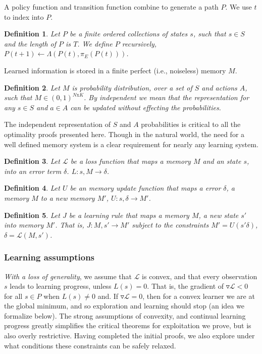\documentclass[9pt,twocolumn,twoside]{pnas-new}
\newtheorem{definition}{Definition}
\begin{document}
A policy function and transition function combine to generate a path $P$. We use $t$ to index into $P$. 

\begin{definition}
    Let $P$ be a finite ordered collections of states $s$, such that $s \in S$ and the length of $P$ is $T$. We define $P$ recursively, $P(t+1) \leftarrow \Lambda(P(t), \pi_E(P(t)))$.
\end{definition}

Learned information is stored in a finite perfect (i.e., noiseless) memory $M$. 
    
\begin{definition}
    Let $M$ is probability distribution, over a set of $S$ and actions $A$, such that $M \in (0, 1)^{N\text{x}K}$. By independent we mean that the representation for any $s \in S$ and $a \in A$ can be updated without effecting the probabilities. 
\end{definition}

The independent representation of $S$ and $A$ probabilities is critical to all the optimality proofs presented here. Though in the natural world, the need for a well defined memory system is a clear requirement for nearly any learning system.

\begin{definition}
    Let $\mathcal{L}$ be a loss function that maps a memory $M$ and an state $s$, into an error term $\delta$. $L : s, M \rightarrow \delta$.
\end{definition}

\begin{definition}
    Let $U$ be an memory update function that maps a error $\delta$, a memory $M$ to a new memory $M'$, $U : s, \delta \rightarrow M'$.
\end{definition}

\begin{definition}
    Let $J$ be a learning rule that maps a memory $M$, a new state $s'$ into memory $M'$. That is, $J : M, s' \rightarrow M'$ subject to the constraints  $M' = U(s' \delta)$, $\delta = \mathcal{L}(M, s')$.
\end{definition}

\subsubsection*{Learning assumptions}
\textit{With a loss of generality}, we assume that $\mathcal{L}$ is convex, and that every observation $s$ leads to learning progress, unless $L(s) = 0$. That is, the gradient of $\triangledown \mathcal{L} < 0$ for all $s \in P$ when $L(s) \neq 0$ and. If $\triangledown \mathcal{L} = 0$, then for a convex learner we are at the global minimum, and so exploration and learning should stop (an idea we formalize below). The strong assumptions of convexity, and continual learning progress greatly simplifies the critical theorems for exploitation we prove, but is also overly restrictive. Having completed the initial proofs, we also explore under what conditions these constraints can be safely relaxed.
\end{document}
